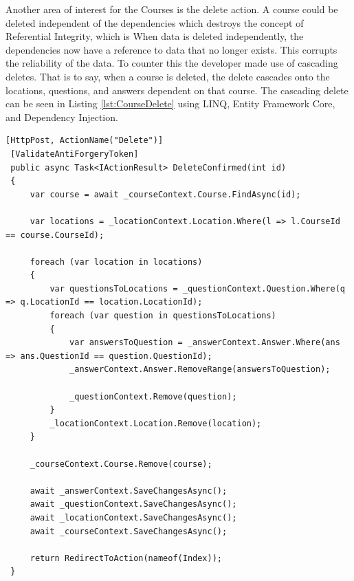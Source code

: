  Another area of interest for the Courses is the delete action. A course could be deleted independent of the dependencies which destroys the concept of Referential Integrity, which is  When data is deleted independently, the dependencies now have a reference to data that no longer exists. This corrupts the reliability of the data. To counter this the developer made use of cascading deletes. That is to say, when a course is deleted, the delete cascades onto the locations, questions, and answers dependent on that course. The cascading delete can be seen in Listing \ref{lst:CourseDelete} using LINQ, Entity Framework Core, and Dependency Injection.
 \begin{lstlisting}[caption=Course Cascade Delete, label=lst:CourseDelete]
 [HttpPost, ActionName("Delete")]
 [ValidateAntiForgeryToken]
 public async Task<IActionResult> DeleteConfirmed(int id)
 {
	 var course = await _courseContext.Course.FindAsync(id);
	 
	 var locations = _locationContext.Location.Where(l => l.CourseId == course.CourseId);
	 
	 foreach (var location in locations)
	 {
		 var questionsToLocations = _questionContext.Question.Where(q => q.LocationId == location.LocationId);
		 foreach (var question in questionsToLocations)
		 {
			 var answersToQuestion = _answerContext.Answer.Where(ans => ans.QuestionId == question.QuestionId);
			 _answerContext.Answer.RemoveRange(answersToQuestion);
			 
			 _questionContext.Remove(question);
		 }
		 _locationContext.Location.Remove(location);
	 }
	 
	 _courseContext.Course.Remove(course);
	 
	 await _answerContext.SaveChangesAsync();
	 await _questionContext.SaveChangesAsync();
	 await _locationContext.SaveChangesAsync();
	 await _courseContext.SaveChangesAsync();
	 
	 return RedirectToAction(nameof(Index));
 }
 \end{lstlisting}
 
